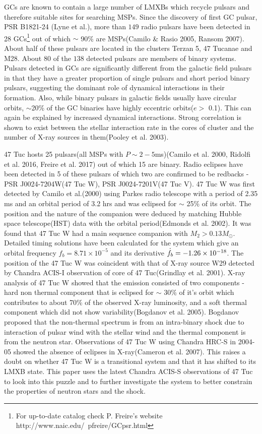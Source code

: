 \documentclass[a4paper,fleqn,usenatbib]{mnras}
\newcommand{\dispdot}[2][.2ex]{\dot{\raisebox{0pt}[\dimexpr\height+#1][\depth]{$#2$}}}%
\begin{document}
GCs are known to contain a large number of LMXBs which recycle pulsars and therefore suitable sites for searching MSPs. Since the discovery of first GC pulsar, PSR B1821-24 (Lyne et al.), more than $149$ radio pulsars have been detected in 28 GCs\footnote{For up-to-date catalog check P. Freire's website http://www.naic.edu/~pfreire/GCpsr.html} out of which $\sim$ 90\% are MSPs(Camilo \& Rasio 2005, Ransom 2007). About half of these pulsars are located in the clusters Terzan 5, 47 Tucanae and M28. About $80$ of the $138$ detected pulsars are members of binary systems. Pulsars detected in GCs are significantly different from the galactic field pulsars in that they have a greater proportion of single pulsars and short period binary pulsars, suggesting the dominant role of dynamical interactions in their formation. Also, while binary pulsars in galactic fields usually have circular orbits, $\sim$20\% of the GC binaries have highly eccentric orbits($e >$ 0.1). This can again be explained by increased dynamical interactions. Strong correlation is shown to exist between the stellar interaction rate in the cores of cluster and the number of X-ray sources in them(Pooley et al. 2003).

47 Tuc hosts 25 pulsars(all MSPs with $P\sim2-5$ms)(Camilo et al. 2000, Ridolfi et al. 2016, Freire et al. 2017) out of which 15 are binary. Radio eclipses have been detected in 5 of these pulsars of which two are confirmed to be redbacks - PSR J0024-7204W(47 Tuc W), PSR J0024-7201V(47 Tuc V). 47 Tuc W was first detected by Camilo et al.(2000) using Parkes radio telescope with a period of 2.35 ms and an orbital period of 3.2 hrs and was eclipsed for $\sim$ 25\% of its orbit. The position and the nature of the companion were deduced by matching Hubble space telescope(HST) data with the orbital period(Edmonds et al. 2002). It was found that 47 Tuc W had a main sequence companion with $M_2 > 0.13 M_{\odot}$. Detailed timing solutions have been calculated for the system which give an orbital frequency $f_b = 8.71 \times 10^{-5}$ and its derivative $\dispdot{f_b} = -1.26 \times 10^{-18}$. The position of the 47 Tuc W was coincident with that of X-ray source W29 detected by Chandra ACIS-I observation of core of 47 Tuc(Grindlay et al. 2001). X-ray analysis of 47 Tuc W showed that the emission consisted of two components - hard non thermal component that is eclipsed for $\sim$ 30\% of it's orbit which contributes to about 70\% of the observed X-ray luminosity, and a soft thermal component which did not show variability(Bogdanov et al. 2005). Bogdanov proposed that the non-thermal spectrum is from an intra-binary shock due to interaction of pulsar wind with the stellar wind and the thermal component is from the neutron star. Observations of 47 Tuc W using Chandra HRC-S in 2004-05 showed the absence of eclipses in X-ray(Cameron et al. 2007). This raises a doubt on whether 47 Tuc W is a transitional system and that it has shifted to its LMXB state. This paper uses the latest Chandra ACIS-S observations of 47 Tuc to look into this puzzle and to further investigate the system to better constrain the properties of neutron stars and the shock.
\end{document}
